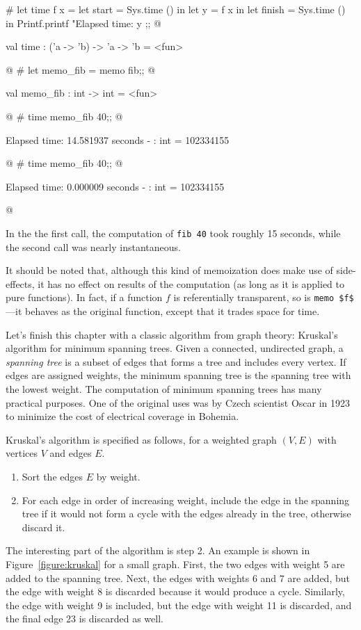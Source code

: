 \begin{ocaml}
# let time f x =
   let start = Sys.time () in
   let y = f x in
   let finish = Sys.time () in
   Printf.printf "Elapsed time: %
   y
;;
@
\begin{topoutput}
val time : ('a -> 'b) -> 'a -> 'b = <fun>
\end{topoutput}
@
# let memo_fib = memo fib;;
@
\begin{topoutput}
val memo_fib : int -> int = <fun>
\end{topoutput}
@
# time memo_fib 40;;
@
\begin{topoutput}
Elapsed time: 14.581937 seconds
- : int = 102334155
\end{topoutput}
@
# time memo_fib 40;;
@
\begin{topoutput}
Elapsed time: 0.000009 seconds
- : int = 102334155
\end{topoutput}
@
\end{ocaml}
%
In the the first call, the computation of \hbox{\lstinline/fib 40/} took roughly 15 seconds, while the second
call was nearly instantaneous.

It should be noted that, although this kind of memoization does make use of side-effects, it has no
effect on results of the computation (as long as it is applied to pure functions).  In fact, if a
function $f$ is referentially transparent, so is \hbox{\lstinline/memo $f$/}---it behaves
as the original function, except that it trades space for time.


Let's finish this chapter with a classic algorithm from graph theory: Kruskal's algorithm for
minimum spanning trees.  Given a connected, undirected graph, a \emph{spanning tree} is a subset of
edges that forms a tree and includes every vertex.  If edges are assigned weights, the minimum
spanning tree is the spanning tree with the lowest weight.  The computation of minimum spanning
trees has many practical purposes.  One of the original uses was by Czech scientist Oscar
 in 1923 to minimize the cost of electrical coverage in Bohemia.

Kruskal's algorithm is specified as follows, for a weighted graph $(V, E)$ with vertices $V$ and
edges $E$.

\begin{enumerate}
\item Sort the edges $E$ by weight.
\item
For each edge in order of increasing weight, include the edge in the spanning tree if it would not form
a cycle with the edges already in the tree, otherwise discard it.
\end{enumerate}
%
The interesting part of the algorithm is step 2.  An example is shown in Figure~\ref{figure:kruskal}
for a small graph.  First, the two edges with weight 5 are added to the spanning tree.  Next, the
edges with weights 6 and 7 are added, but the edge with weight 8 is discarded because it would
produce a cycle.  Similarly, the edge with weight 9 is included, but the edge with weight 11 is
discarded, and the final edge 23 is discarded as well.

